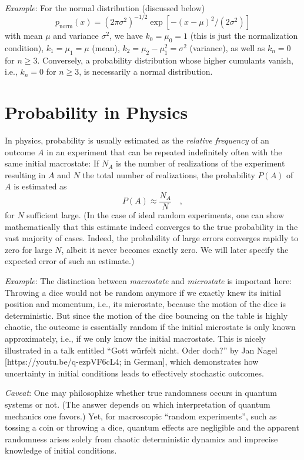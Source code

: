 \documentclass{notebook}
\newcommand{\Caveat}{\textit{Caveat}}
\newcommand{\Example}{\textit{Example}}
\begin{document}
\Example: For the normal distribution (discussed below)
$$p_\mathrm{norm}(x) = (2\pi \sigma^2)^{-1/2} \exp[ - (x-\mu)^2/(2\sigma^2) ]$$
with mean $\mu$ and variance $\sigma^2$, we have 
$k_0 = \mu_0=1$ (this is just the normalization condition), 
$k_1=\mu_1=\mu$ (mean), 
$k_2=\mu_2-\mu_1^2=\sigma^2$ (variance), as well as $k_n=0$ for $n \ge 3$.
Conversely, a probability distribution whose higher cumulants vanish, 
i.e., $k_n=0$ for $n \ge 3$, is necessarily a normal distribution.


\section{Probability in Physics} 
\label{sec:1_2}

In physics, probability is usually estimated as 
the \textit{relative frequency} of an outcome $A$ in an experiment
that can be repeated indefinitely often with the same initial macrostate:
If $N_A$ is the number of realizations of the experiment resulting in $A$ 
and $N$ the total number of realizations, the probability $P(A)$ of $A$ is estimated as
\begin{equation}
P(A) \approx \frac{N_A}{N} \quad,
\end{equation}
for $N$ sufficient large.
(In the case of ideal random experiments, 
one can show mathematically that
this estimate indeed converges to the true probability 
in the vast majority of cases. 
Indeed, the probability of large errors converges rapidly to zero for large $N$, 
albeit it never becomes exactly zero.
We will later specify the expected error of such an estimate.) %

\Example: 
The distinction between \textit{macrostate} and \textit{microstate} is important here: 
Throwing a dice would not be random anymore if we exactly knew its initial position and momentum, 
i.e., its microstate, because the motion of the dice is deterministic. 
But since the motion of the dice bouncing on the table is highly chaotic, 
the outcome is essentially random if the initial microstate is only known approximately, 
i.e., if we only know the initial macrostate.
This is nicely illustrated in a talk entitled 
``Gott w\"urfelt nicht. Oder doch?'' by Jan Nagel [https://youtu.be/q-ezpVF6cL4; in German], 
which demonstrates how uncertainty in initial conditions leads to effectively stochastic outcomes.

\Caveat: 
One may philosophize whether true randomness occurs in quantum systems or not.
(The answer depends on which interpretation of quantum mechanics one favors.)
Yet, for macroscopic ``random experiments'', such as tossing a coin or throwing a dice, 
quantum effects are negligible and the apparent randomness arises solely from chaotic deterministic dynamics and imprecise knowledge of initial conditions.
\end{document}
